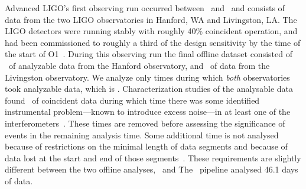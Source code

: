 Advanced \ac{LIGO}'s first observing run occurred between \OoneSTART\ and \OoneEND\
and consists of data from the two \ac{LIGO} observatories in Hanford, WA and Livingston, LA.
The LIGO detectors were running stably with roughly 40\% coincident operation, and had
been commissioned to roughly a third of the design sensitivity by the time of the start of O1~\citep{Martynov:2016fzi}.
During this observing run the final offline dataset consisted of \OoneOfflineAnalysableHTimeSeconds\
of analyzable data from the Hanford observatory, and \OoneOfflineAnalysableLTimeSeconds\ of data from the
Livingston observatory. We analyze only times during which \emph{both} observatories
took analyzable data, which is \OoneOfflineAnalysableTimeSeconds. Characterization studies of the analysable
data found \OoneOfflineAnalysableCatTwoDiffSeconds\ of coincident data during which time
there was some identified instrumental problem---known to
introduce excess noise---in at least one of the interferometers~\citep{TheLIGOScientific:2016zmo}.
These times are removed before assessing the significance of events
in the remaining analysis time. Some additional time is not analysed because
of restrictions on the minimal length of data segments and because of data lost
at the start and end of those segments~\citep{TheLIGOScientific:2016qqj, TheLIGOScientific:2016pea}.
These requirements are slightly different between the two offline analyses, \pycbc\ and \gstlal\. The \pycbc\
pipeline analysed 46.1 days of data.
